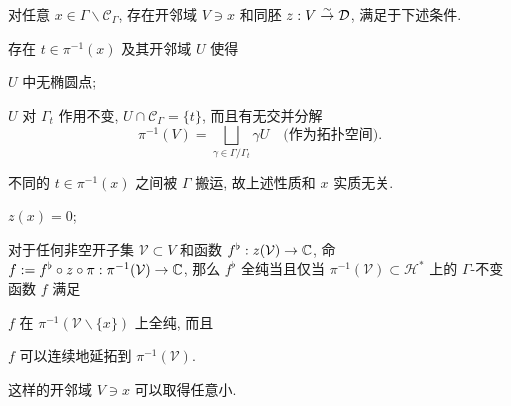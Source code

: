 \begin{lemma}\label{prop:glueing-holomorphy-cusp}
	对任意 $x \in \Gamma \backslash \mathcal{C}_\Gamma$, 存在开邻域 $V \ni x$ 和同胚 $z: V \stackrel{\sim}{\rightarrow} \mathcal{D}$, 满足于下述条件.
	\begin{compactitem}
		\item 存在 $t \in \pi^{-1}(x)$ 及其开邻域 $U$ 使得
		\begin{compactitem}
			\item $U$  中无椭圆点;
			\item $U$ 对 $\Gamma_t$ 作用不变, $U \cap \mathcal{C}_\Gamma = \{t\}$, 而且有无交并分解
			\[ \pi^{-1}(V) = \bigsqcup_{\gamma \in  \Gamma/\Gamma_t} \gamma U \quad \text{(作为拓扑空间)}. \]
		\end{compactitem}
		不同的 $t \in \pi^{-1}(x)$ 之间被 $\Gamma$ 搬运, 故上述性质和 $x$ 实质无关.
		\item $z(x) = 0$;
		\item 对于任何非空开子集 $\mathcal{V} \subset V$ 和函数 $f^\flat: z(\mathcal{V}) \to \mathbb{C}$, 命 $f := f^\flat \circ z \circ \pi: \pi^{-1}(\mathcal{V}) \to \mathbb{C}$, 那么 $f^\flat$ 全纯当且仅当 $\pi^{-1}(\mathcal{V}) \subset \mathcal{H}^*$ 上的 $\Gamma$-不变函数 $f$ 满足
		\begin{compactitem}
			\item $f$ 在 $\pi^{-1}(\mathcal{V} \smallsetminus \{x\})$ 上全纯, 而且
			\item $f$ 可以连续地延拓到 $\pi^{-1}(\mathcal{V})$.
		\end{compactitem}
	\end{compactitem}
	这样的开邻域 $V \ni x$ 可以取得任意小.
\end{lemma}
